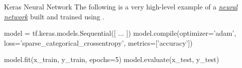 \documentclass{cognito}
\begin{document}






\begin{draft}{Keras Neural Network}
	The following is a very high-level example of a \hyperref[note:Artificial Neural Network]{\it neural network}
	built and trained using .
	\begin{largecode}
model = tf.keras.models.Sequential([ ... ])
model.compile(optimizer='adam',
	loss='sparse_categorical_crossentropy',
	metrics=['accuracy'])

model.fit(x_train, y_train, epochs=5)
model.evaluate(x_test, y_test)
	\end{largecode}
	\vspace{-5pt}
\end{draft}
\end{document}
